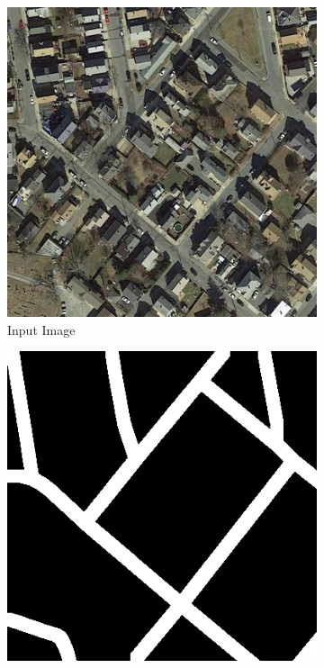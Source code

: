  \begin{figure}
 \centering
   \begin{subfigure}[b]{0.3\linewidth}
     \includegraphics[width=\linewidth]{images/144_1_input_step_513.png}
     \caption{Input Image}
   \end{subfigure}
   \begin{subfigure}[b]{0.3\linewidth}
     \includegraphics[width=\linewidth]{images/144_2_true_step_513.png}

\end{subfigure}
\end{figure}
